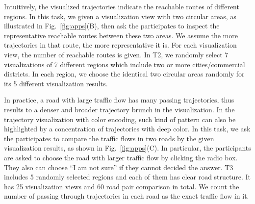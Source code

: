 Intuitively, the visualized trajectories indicate the reachable routes of different regions.
In this task, we given a visualization view with two circular areas, as illustrated in Fig.~\ref{fig:apps}(B),
then ask the participates to inspect the representative reachable routes between these two areas.
We assume the more trajectories in that route, the more representative it is.
For each visualization view, the number of reachable routes is given.
In T2, we randomly select 7 visualizations of 7 different regions which include two or more cities/commercial districts.
In each region, we choose the identical two circular areas randomly for its 5 different visualization results.


In practice, a road with large traffic flow has many passing trajectories, thus results to a denser and broader trajectory brunch in the visualization.
In the trajectory visualization with color encoding, such kind of pattern can also be highlighted by a concentration of trajectories with deep color.
In this task, we ask the participates to compare the traffic flows in two roads by the given visualization results, as shown in Fig.~\ref{fig:apps}(C).
In particular, the participants are asked to choose the road with larger traffic flow by clicking the radio box.
They also can choose ``I am not sure'' if they cannot decided the answer.
T3 includes 5 randomly selected regions and each of them has clear road structure.
It has 25 visualization views and 60 road pair comparison in total.
We count the number of passing through trajectories in each road as the exact traffic flow in it.





